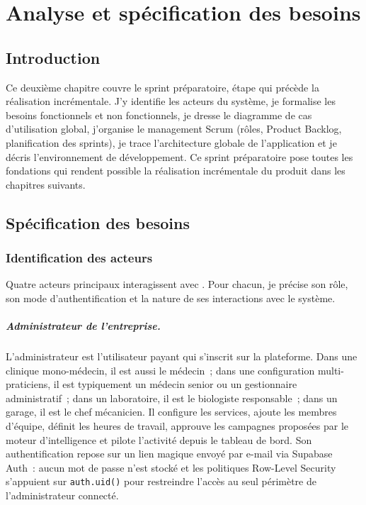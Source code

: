 \chapter{Analyse et spécification des besoins}

\section{Introduction}
Ce deuxième chapitre couvre le sprint préparatoire, étape qui
précède la réalisation incrémentale. J'y identifie les acteurs du
système, je formalise les besoins fonctionnels et non fonctionnels,
je dresse le diagramme de cas d'utilisation global, j'organise le
management Scrum (rôles, Product Backlog, planification des
sprints), je trace l'architecture globale de l'application et je
décris l'environnement de développement. Ce sprint préparatoire
pose toutes les fondations qui rendent possible la réalisation
incrémentale du produit dans les chapitres suivants.

\section{Spécification des besoins}

\subsection{Identification des acteurs}
Quatre acteurs principaux interagissent avec \nova. Pour chacun, je
précise son rôle, son mode d'authentification et la nature de ses
interactions avec le système.

\paragraph{Administrateur de l'entreprise.}
L'administrateur est l'utilisateur payant qui s'inscrit sur la
plateforme. Dans une clinique mono-médecin, il est aussi le médecin~;
dans une configuration multi-praticiens, il est typiquement un
médecin senior ou un gestionnaire administratif~; dans un
laboratoire, il est le biologiste responsable~; dans un garage, il
est le chef mécanicien. Il configure les services, ajoute les
membres d'équipe, définit les heures de travail, approuve les
campagnes proposées par le moteur d'intelligence et pilote
l'activité depuis le tableau de bord. Son authentification repose
sur un lien magique envoyé par e-mail via Supabase Auth~: aucun mot
de passe n'est stocké et les politiques Row-Level Security
s'appuient sur \texttt{auth.uid()} pour restreindre l'accès au seul
périmètre de l'administrateur connecté.

